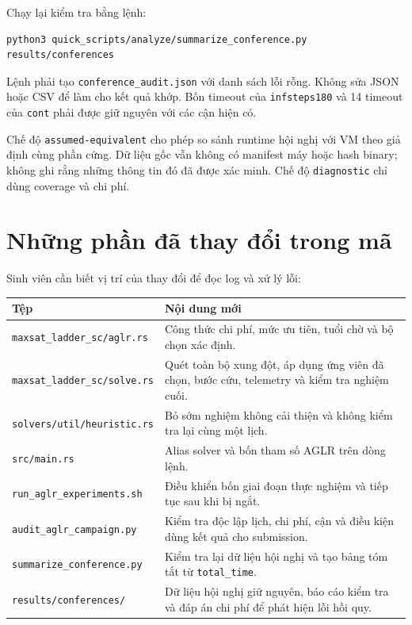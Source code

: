 \documentclass[11pt,a4paper]{article}
\newcommand{\code}[1]{\texttt{#1}}
\newcommand{\file}[1]{\nolinkurl{#1}}
\begin{document}
Chạy lại kiểm tra bằng lệnh:

\begin{verbatim}
python3 quick_scripts/analyze/summarize_conference.py results/conferences
\end{verbatim}

Lệnh phải tạo \file{conference_audit.json} với danh sách lỗi rỗng. Không sửa
JSON hoặc CSV để làm cho kết quả khớp. Bốn timeout của \code{infsteps180} và 14
timeout của \code{cont} phải được giữ nguyên với các cận hiện có.

Chế độ \code{assumed-equivalent} cho phép so sánh runtime hội nghị với VM theo
giả định cùng phần cứng. Dữ liệu gốc vẫn không có manifest máy hoặc hash
binary; không ghi rằng những thông tin đó đã được xác minh. Chế độ
\code{diagnostic} chỉ dùng coverage và chi phí.

\section{Những phần đã thay đổi trong mã}

Sinh viên cần biết vị trí của thay đổi để đọc log và xử lý lỗi:

\begin{tabularx}{\textwidth}{@{}p{59mm}X@{}}
\toprule
Tệp & Nội dung mới \\
\midrule
\file{maxsat_ladder_sc/aglr.rs} & Công thức chi phí, mức ưu tiên, tuổi chờ và
bộ chọn xác định. \\
\file{maxsat_ladder_sc/solve.rs} & Quét toàn bộ xung đột, áp dụng ứng viên đã
chọn, bước cứu, telemetry và kiểm tra nghiệm cuối. \\
\file{solvers/util/heuristic.rs} & Bỏ sớm nghiệm không cải thiện và không kiểm
tra lại cùng một lịch. \\
\file{src/main.rs} & Alias solver và bốn tham số AGLR trên dòng lệnh. \\
\file{run_aglr_experiments.sh} & Điều khiển bốn giai đoạn thực nghiệm và tiếp
tục sau khi bị ngắt. \\
\file{audit_aglr_campaign.py} & Kiểm tra độc lập lịch, chi phí, cận và điều kiện
dùng kết quả cho submission. \\
\file{summarize_conference.py} & Kiểm tra lại dữ liệu hội nghị và tạo bảng tóm
tắt từ \file{total_time}. \\
\file{results/conferences/} & Dữ liệu hội nghị giữ nguyên, báo cáo kiểm tra và
đáp án chi phí để phát hiện lỗi hồi quy. \\
\bottomrule
\end{tabularx}
\end{document}
